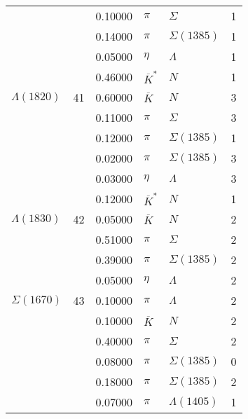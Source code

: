 \documentclass[a4paper,10pt]{article}
\begin{document}
\begin{tabular}[t]{lrllll}
$                    $&   & 0.10000&$ \pi                 $ &$ \Sigma              $& 1\\
$                    $&   & 0.14000&$ \pi                 $ &$ \Sigma(1385)        $& 1\\
$                    $&   & 0.05000&$ \eta                $ &$ \Lambda             $& 1\\
$                    $&   & 0.46000&$ \overline{K}^*      $ &$ N                   $& 1\\
\midrule
$      \Lambda(1820) $& 41& 0.60000&$ \overline{K}        $ &$ N                   $& 3\\
$                    $&   & 0.11000&$ \pi                 $ &$ \Sigma              $& 3\\
$                    $&   & 0.12000&$ \pi                 $ &$ \Sigma(1385)        $& 1\\
$                    $&   & 0.02000&$ \pi                 $ &$ \Sigma(1385)        $& 3\\
$                    $&   & 0.03000&$ \eta                $ &$ \Lambda             $& 3\\
$                    $&   & 0.12000&$ \overline{K}^*      $ &$ N                   $& 1\\
\midrule
$      \Lambda(1830) $& 42& 0.05000&$ \overline{K}        $ &$ N                   $& 2\\
$                    $&   & 0.51000&$ \pi                 $ &$ \Sigma              $& 2\\
$                    $&   & 0.39000&$ \pi                 $ &$ \Sigma(1385)        $& 2\\
$                    $&   & 0.05000&$ \eta                $ &$ \Lambda             $& 2\\
\midrule
$      \Sigma(1670)  $& 43& 0.10000&$ \pi                 $ &$ \Lambda             $& 2\\
$                    $&   & 0.10000&$ \overline{K}        $ &$ N                   $& 2\\
$                    $&   & 0.40000&$ \pi                 $ &$ \Sigma              $& 2\\
$                    $&   & 0.08000&$ \pi                 $ &$ \Sigma(1385)        $& 0\\
$                    $&   & 0.18000&$ \pi                 $ &$ \Sigma(1385)        $& 2\\
$                    $&   & 0.07000&$ \pi                 $ &$ \Lambda(1405)       $& 1\\

\end{tabular}
\end{document}
